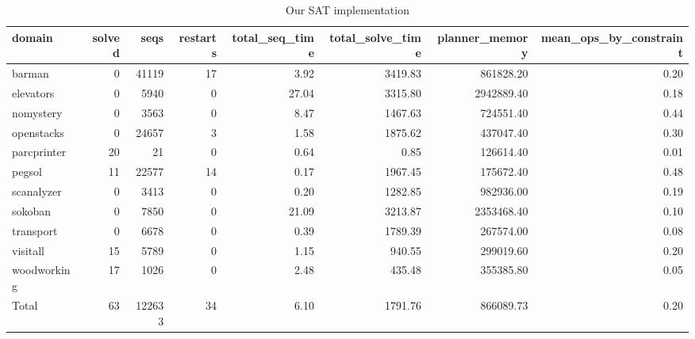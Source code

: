 \begin{table*}[htbp]
\centering
\begingroup\small
\begin{tabular}{lrrrrrrr}
  \hline
domain & solved & seqs & restarts & total\_seq\_time & total\_solve\_time & planner\_memory & mean\_ops\_by\_constraint \\ 
  \hline
barman &   0 & 41119 &  17 & 3.92 & 3419.83 & 861828.20 & 0.20 \\ 
  elevators &   0 & 5940 &   0 & 27.04 & 3315.80 & 2942889.40 & 0.18 \\ 
  nomystery &   0 & 3563 &   0 & 8.47 & 1467.63 & 724551.40 & 0.44 \\ 
  openstacks &   0 & 24657 &   3 & 1.58 & 1875.62 & 437047.40 & 0.30 \\ 
  parcprinter &  20 &  21 &   0 & 0.64 & 0.85 & 126614.40 & 0.01 \\ 
  pegsol &  11 & 22577 &  14 & 0.17 & 1967.45 & 175672.40 & 0.48 \\ 
  scanalyzer &   0 & 3413 &   0 & 0.20 & 1282.85 & 982936.00 & 0.19 \\ 
  sokoban &   0 & 7850 &   0 & 21.09 & 3213.87 & 2353468.40 & 0.10 \\ 
  transport &   0 & 6678 &   0 & 0.39 & 1789.39 & 267574.00 & 0.08 \\ 
  visitall &  15 & 5789 &   0 & 1.15 & 940.55 & 299019.60 & 0.20 \\ 
  woodworking &  17 & 1026 &   0 & 2.48 & 435.48 & 355385.80 & 0.05 \\ 
  Total &  63 & 122633 &  34 & 6.10 & 1791.76 & 866089.73 & 0.20 \\ 
   \hline
\end{tabular}
\endgroup
\caption{Our SAT implementation} 
\label{tab:sat}
\end{table*}
